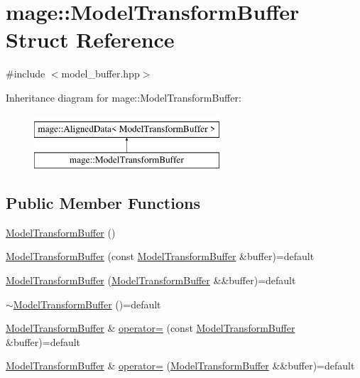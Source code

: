 \hypertarget{structmage_1_1_model_transform_buffer}{}\section{mage\+:\+:Model\+Transform\+Buffer Struct Reference}
\label{structmage_1_1_model_transform_buffer}


{\ttfamily \#include $<$model\+\_\+buffer.\+hpp$>$}

Inheritance diagram for mage\+:\+:Model\+Transform\+Buffer\+:\begin{figure}[H]
\begin{center}
\leavevmode
\includegraphics[height=2.000000cm]{structmage_1_1_model_transform_buffer}
\end{center}
\end{figure}
\subsection*{Public Member Functions}
\begin{DoxyCompactItemize}
\item 
\hyperlink{structmage_1_1_model_transform_buffer_a6c137b9d041ea196f656953002d19d54}{Model\+Transform\+Buffer} ()
\item 
\hyperlink{structmage_1_1_model_transform_buffer_ad34272500e8c61dccb14a1e52af4fe73}{Model\+Transform\+Buffer} (const \hyperlink{structmage_1_1_model_transform_buffer}{Model\+Transform\+Buffer} \&buffer)=default
\item 
\hyperlink{structmage_1_1_model_transform_buffer_a3043efb7ecff1a81d8d5da4acfb47081}{Model\+Transform\+Buffer} (\hyperlink{structmage_1_1_model_transform_buffer}{Model\+Transform\+Buffer} \&\&buffer)=default
\item 
\hyperlink{structmage_1_1_model_transform_buffer_a08e8a2d136cfbdaa9f13917cdeec9b03}{$\sim$\+Model\+Transform\+Buffer} ()=default
\item 
\hyperlink{structmage_1_1_model_transform_buffer}{Model\+Transform\+Buffer} \& \hyperlink{structmage_1_1_model_transform_buffer_a1b74e4281d67712623486e3a5e083083}{operator=} (const \hyperlink{structmage_1_1_model_transform_buffer}{Model\+Transform\+Buffer} \&buffer)=default
\item 
\hyperlink{structmage_1_1_model_transform_buffer}{Model\+Transform\+Buffer} \& \hyperlink{structmage_1_1_model_transform_buffer_a20bef96b30eda8f63585eb70e20a004c}{operator=} (\hyperlink{structmage_1_1_model_transform_buffer}{Model\+Transform\+Buffer} \&\&buffer)=default
\end{DoxyCompactItemize}
